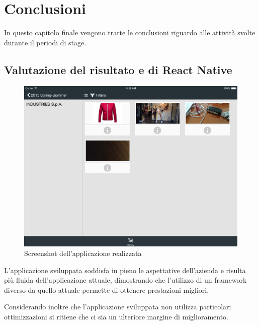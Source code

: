
\chapter{Conclusioni}
\label{cap:conclusioni}

In questo capitolo finale vengono tratte le conclusioni riguardo alle attività svolte durante il periodi di stage.

\section{Valutazione del risultato e di React Native}

\begin{figure}[htp]
\centering
\includegraphics[width=\textwidth]{../immagini/wg-gallery}
\caption{Screenshot dell'applicazione realizzata}  
\end{figure}

L'applicazione sviluppata soddisfa in pieno le aspettative dell'azienda e risulta più fluida dell'applicazione attuale, dimostrando che l'utilizzo di un framework diverso da quello attuale permette di ottenere prestazioni migliori.

Considerando inoltre che l'applicazione sviluppata non utilizza particolari ottimizzazioni si ritiene che ci sia un ulteriore margine di miglioramento.


